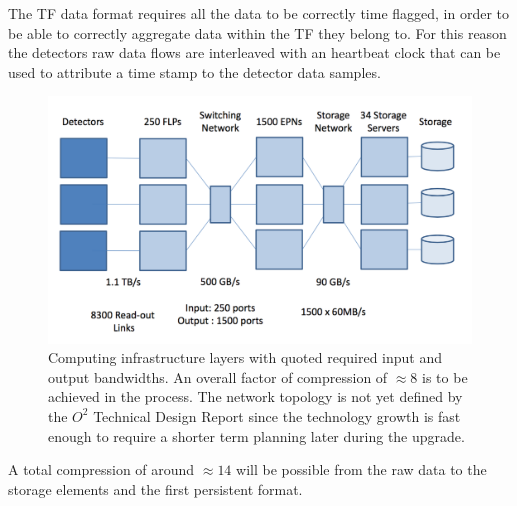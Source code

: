 The TF data format requires all the data to be correctly time flagged, in order to be able to correctly aggregate data within the TF they belong to.
For this reason the detectors raw data flows are interleaved with an heartbeat clock that can be used to attribute a time stamp to the detector data samples.


\begin{figure}[!ht]
\begin{center}
\includegraphics[width=0.75\linewidth]{Chapters/O2/Figs/Compression.pdf}
\caption{Computing infrastructure layers with quoted required input and output bandwidths. An overall factor of compression of $\approx8$ is to be achieved in the process. The network topology is not yet defined by the $O^2$ Technical Design Report since the technology growth is fast enough to require a shorter term planning later during the upgrade.}
\label{fig:O2_Compression}
\end{center}
\end{figure}

A total compression of around $\approx14$ \cite{o2compression} will be possible from the raw data to the storage elements and the first persistent format.

